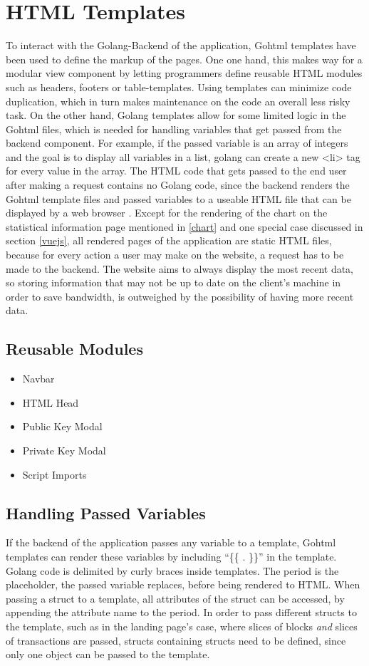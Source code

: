 \section{HTML Templates}
To interact with the Golang-Backend of the application, Gohtml templates \cite{template} have been used to define the markup of the pages. One one hand, this makes way for a modular view component by letting programmers define reusable HTML modules such as headers, footers or table-templates. Using templates can minimize code duplication, which in turn makes maintenance on the code an overall less risky task. On the other hand, Golang templates allow for some limited logic in the Gohtml files, which is needed for handling variables that get passed from the backend component. For example, if the passed variable is an array of integers and the goal is to display all variables in a list, golang can create a new <li> tag for every value in the array. The HTML code that gets passed to the end user after making a request contains no Golang code, since the backend renders the Gohtml template files and passed variables to a useable HTML file that can be displayed by a web browser \cite{httppackage}. Except for the rendering of the chart on the statistical information page mentioned in \ref{chart} and one special case discussed in section \ref{vuejs}, all rendered pages of the application are static HTML files, because for every action a user may make on the website, a request has to be made to the backend. The website aims to always display the most recent data, so storing information that may not be up to date on the client's machine in order to save bandwidth, is outweighed by the possibility of having more recent data. 

\subsection{Reusable Modules}
\begin{itemize}
\item{Navbar}
\item{HTML Head}
\item{Public Key Modal}
\item{Private Key Modal}
\item{Script Imports}
\end{itemize}

\subsection{Handling Passed Variables}
If the backend of the application passes any variable to a template, Gohtml templates can render these variables by including ``\{\{ . \}\}'' in the template. Golang code is delimited by curly braces inside templates. The period is the placeholder, the passed variable replaces, before being rendered to HTML. When passing a struct to a template, all attributes of the struct can be accessed, by appending the attribute name to the period. In order to pass different structs to the template, such as in the landing page's case, where slices of blocks \emph{and} slices of transactions are passed, structs containing structs need to be defined, since only one object can be passed to the template. 

